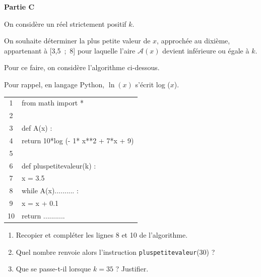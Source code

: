 \medskip

\textbf{Partie C}

\medskip

On considère un réel strictement positif $k$.

On souhaite déterminer la plus petite valeur de $x$, approchée au dixième, appartenant à [3,5~;~8] pour laquelle l’aire $\mathcal{A}(x)$ devient inférieure ou égale à $k$.

Pour ce faire, on considère l’algorithme ci-dessous.

Pour rappel, en langage Python, $\ln (x)$ s’écrit log ($x$).

\begin{center}
\begin{ttfamily}
\begin{tabular}{c l}
1&from math import *\\
2&\\
3&def A(x) :\\
4&\quad return 10*log (- 1* x**2 + 7*x + 9)\\
5&\quad \\
6&def pluspetitevaleur(k) :\\
7&\quad x = 3.5\\
8&\quad while A(x).......... :\\
9& \qquad x = x + 0.1\\
10&\quad return ...........
\end{tabular}
\end{ttfamily}
\end{center}

\smallskip

\begin{enumerate}
\item Recopier et compléter les lignes 8 et 10 de l’algorithme.
\item Quel nombre renvoie alors l’instruction \texttt{pluspetitevaleur}(30) ?
\item Que se passe-t-il lorsque $k = 35$ ? Justifier.
\end{enumerate}

\medskip
